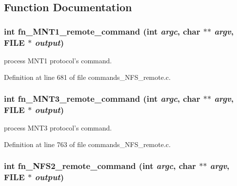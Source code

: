 \subsection{Function Documentation}
\subsubsection[{fn\_\-MNT1\_\-remote\_\-command}]{\setlength{\rightskip}{0pt plus 5cm}int fn\_\-MNT1\_\-remote\_\-command (int {\em argc}, \/  char $\ast$$\ast$ {\em argv}, \/  FILE $\ast$ {\em output})}\label{commands__NFS__remote_8c_1677ca6949081f0d97593268114459a1}


process MNT1 protocol's command. 

Definition at line 681 of file commands\_\-NFS\_\-remote.c.
\subsubsection[{fn\_\-MNT3\_\-remote\_\-command}]{\setlength{\rightskip}{0pt plus 5cm}int fn\_\-MNT3\_\-remote\_\-command (int {\em argc}, \/  char $\ast$$\ast$ {\em argv}, \/  FILE $\ast$ {\em output})}\label{commands__NFS__remote_8c_7d8f2c4570bef1373bc94247b00a753e}


process MNT3 protocol's command. 

Definition at line 763 of file commands\_\-NFS\_\-remote.c.
\subsubsection[{fn\_\-NFS2\_\-remote\_\-command}]{\setlength{\rightskip}{0pt plus 5cm}int fn\_\-NFS2\_\-remote\_\-command (int {\em argc}, \/  char $\ast$$\ast$ {\em argv}, \/  FILE $\ast$ {\em output})}\label{commands__NFS__remote_8c_53ac76af43fede3f2e559a1b4fbb136f}


